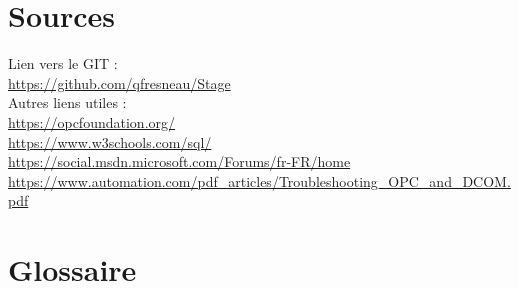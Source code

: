 \documentclass[a4paper,12pt]{extarticle}
\begin{document}
	\clearpage

	\section{Sources}
	
	Lien vers le GIT : \\
\url{https://github.com/qfresneau/Stage}\\

	Autres liens utiles : \\ 
\url{https://opcfoundation.org/}\\
\url{https://www.w3schools.com/sql/}\\
\url{https://social.msdn.microsoft.com/Forums/fr-FR/home}\\
\url{https://www.automation.com/pdf_articles/Troubleshooting_OPC_and_DCOM.pdf}\\
	
	\section{Glossaire}
	
\end{document}
